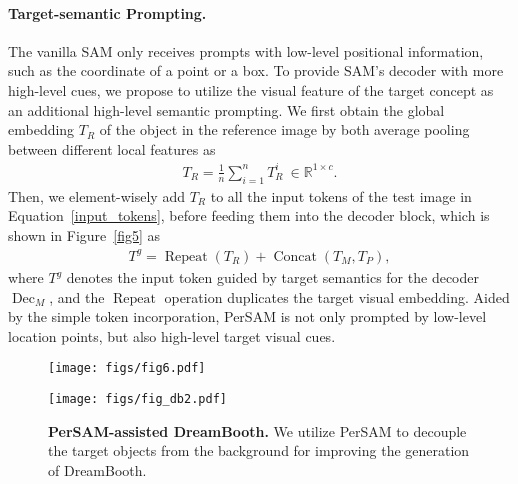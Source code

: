 \documentclass{article} \usepackage{iclr2024_conference,times}
\makeatletter
\newcommand\figcaption{\def\@captype{figure}\caption}
\makeatother
\begin{document}
\paragraph{Target-semantic Prompting.}
The vanilla SAM only receives prompts with low-level positional information, such as the coordinate of a point or a box. To provide SAM's decoder with more high-level cues, we propose to utilize the visual feature of the target concept as an additional high-level semantic prompting. We first obtain the global embedding $T_R$ of the object in the reference image by both average pooling between different local features as
\begin{align}
    T_R = \frac{1}{n}\sum_{i=1}^nT_R^i\ \in \mathbb{R}^{1\times c}.
\end{align}
Then, we element-wisely add $T_R$ to all the input tokens of the test image in Equation~\ref{input_tokens}, before feeding them into the decoder block, which is shown in Figure~\ref{fig5} as
\begin{align}
    T^g = \operatorname{Repeat}(T_R) + \operatorname{Concat}(T_M, T_P),
\end{align}
where $T^g$ denotes the input token guided by target semantics for the decoder $\operatorname{Dec}_M$, and the $\operatorname{Repeat}$ operation duplicates the target visual embedding.
Aided by the simple token incorporation, PerSAM is not only prompted by low-level location points, but also high-level target visual cues.

\begin{figure*}[t!]
\vspace{-0.2cm}
\begin{minipage}[t]{0.45\textwidth}
\texttt{[image: figs/fig6.pdf]}
\figcaption{\textbf{The Scale-aware Fine-tuning in PerSAM-F.} To alleviate the scale ambiguity, PerSAM-F adopts two learnable weights for adaptively aggregating three-scale masks.}
\label{fig6}
\end{minipage}
\hspace{0.27in}
\begin{minipage}[t]{0.45\textwidth}
\texttt{[image: figs/fig\_db2.pdf]}
\figcaption{\textbf{PerSAM-assisted DreamBooth.} We utilize PerSAM to decouple the target objects from the background for improving the generation of DreamBooth.}
\label{fig_db2}
\end{minipage}
\end{figure*}
\end{document}

